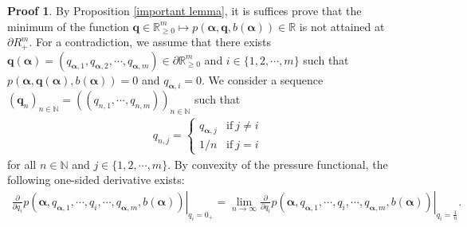 \documentclass{article}
\theoremstyle{definition}
\newtheorem*{pf}{Proof}
\begin{document}
\begin{pf}
 By Proposition \ref{important lemma}, it is suffices prove that the minimum of the function $\boldsymbol{q}\in\mathbb{R}^m_{\geq 0}\mapsto p(\boldsymbol{\alpha},\boldsymbol{q},b(\boldsymbol{\alpha}))\in\mathbb{R}$ is not attained at $\partial{R_{+}^m}$. For a contradiction, we assume that there exists $\boldsymbol{q}(\boldsymbol{\alpha})=(q_{\boldsymbol{\alpha},1},q_{\boldsymbol{\alpha},2},\cdots,q_{\boldsymbol{\alpha},m})\in\partial\mathbb{R}_{\geq 0}^m$ and $i\in\{1,2,\cdots,m\}$ such that $p(\boldsymbol{\alpha},\boldsymbol{q}(\boldsymbol{\alpha}),b(\boldsymbol{\alpha}))=0$ and $q_{\boldsymbol{\alpha},i}=0$. We consider a sequence $(\boldsymbol{q}_n)_{n\in\mathbb{N}}=((q_{n,1},\cdots,q_{n,m}))_{n\in\mathbb{N}}$ such that 
 \begin{align*}
 q_{n,j}=
 \left\{
 \begin{array}{ll}
   q_{\boldsymbol{\alpha},j}   & \text{if}\ j\neq i \\
   {1}/{n}   & \text{if} \ j=i\nonumber
 \end{array}
 \right.  
 \end{align*}
 for all $n\in\mathbb{N}$ and $j\in\{1,2,\cdots,m\}$.
    By convexity of the pressure functional, the following one-sided derivative exists: 
    \begin{align}
        \left. \frac{\partial}{\partial q_i}p(\boldsymbol{\alpha},q_{\boldsymbol{\alpha},1},\cdots,q_i,\cdots,q_{\boldsymbol{\alpha},m},b(\boldsymbol{\alpha}))\right|_{q_i=0_+}\nonumber
        =\lim_{n\to\infty}\left. \frac{\partial}{\partial q_i}p(\boldsymbol{\alpha},q_{\boldsymbol{\alpha},1},\cdots,q_i,\cdots,q_{\boldsymbol{\alpha},m},b(\boldsymbol{\alpha}))\right|_{q_i=\frac{1}{n}}.\nonumber
    \end{align}
    

\end{pf}
\end{document}
